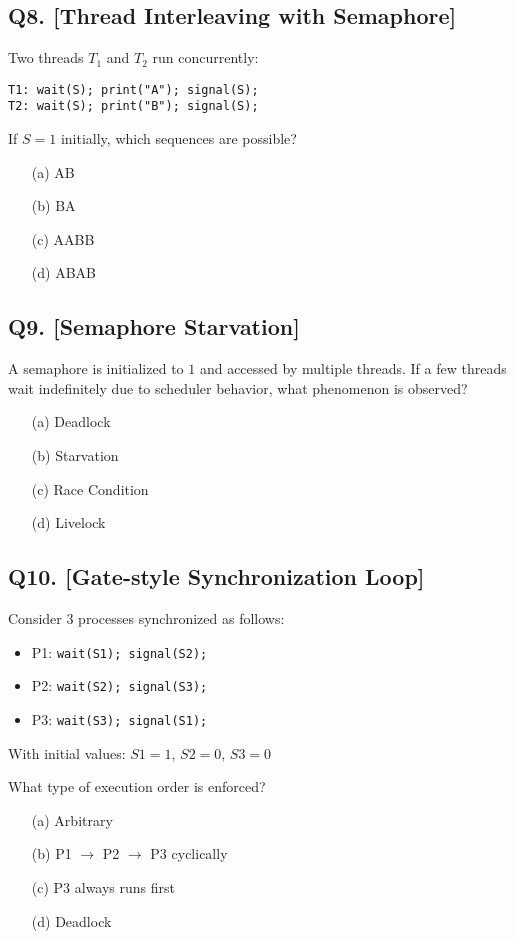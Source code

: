 \vspace{1em}

\subsection*{Q8. [Thread Interleaving with Semaphore]}
Two threads $T_1$ and $T_2$ run concurrently:
\begin{verbatim}
T1: wait(S); print("A"); signal(S);
T2: wait(S); print("B"); signal(S);
\end{verbatim}
If $S = 1$ initially, which sequences are possible?

\begin{itemize}
    \item[(a)] AB
    \item[(b)] BA
    \item[(c)] AABB
    \item[(d)] ABAB
\end{itemize}

\vspace{1em}

\subsection*{Q9. [Semaphore Starvation]}
A semaphore is initialized to $1$ and accessed by multiple threads. If a few threads wait indefinitely due to scheduler behavior, what phenomenon is observed?

\begin{itemize}
    \item[(a)] Deadlock
    \item[(b)] Starvation
    \item[(c)] Race Condition
    \item[(d)] Livelock
\end{itemize}

\vspace{1em}

\subsection*{Q10. [Gate-style Synchronization Loop]}
Consider $3$ processes synchronized as follows:
\begin{itemize}
    \item P1: \texttt{wait(S1); signal(S2);}
    \item P2: \texttt{wait(S2); signal(S3);}
    \item P3: \texttt{wait(S3); signal(S1);}
\end{itemize}
With initial values: $S1=1$, $S2=0$, $S3=0$

What type of execution order is enforced?

\begin{itemize}
    \item[(a)] Arbitrary
    \item[(b)] P1 $\rightarrow$ P2 $\rightarrow$ P3 cyclically
    \item[(c)] P3 always runs first
    \item[(d)] Deadlock
\end{itemize}



